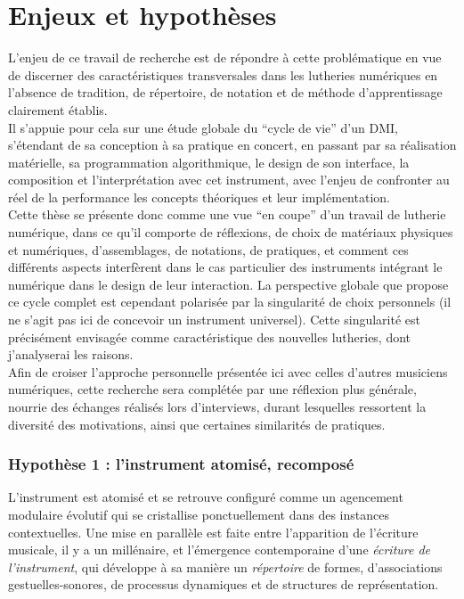 \section{Enjeux et hypothèses}

\noindent L'enjeu de ce travail de recherche est de répondre à cette problématique en vue de discerner des caractéristiques transversales dans les lutheries numériques en l'absence de tradition, de répertoire, de notation et de méthode d'apprentissage clairement établis.\\
\indent Il s'appuie pour cela sur une étude globale du ``cycle de vie'' d'un \gls{DMI}, s'étendant de sa conception à sa pratique en concert, en passant par sa réalisation matérielle, sa programmation algorithmique, le design de son interface, la composition et l'interprétation avec cet instrument, avec l'enjeu de confronter au réel de la performance les concepts théoriques et leur implémentation.\\
\indent Cette thèse se présente donc comme une vue ``en coupe'' d'un travail de lutherie numérique, dans ce qu'il comporte de réflexions, de choix de matériaux physiques et numériques, d'assemblages, de notations, de pratiques, et comment ces différents aspects interfèrent dans le cas particulier des instruments intégrant le numérique dans le design de leur interaction. La perspective globale que propose ce cycle complet est cependant polarisée par la singularité de choix personnels (il ne s'agit pas ici de concevoir un instrument universel). Cette singularité est précisément envisagée comme caractéristique des nouvelles lutheries, dont j'analyserai les raisons.\\
\indent Afin de croiser l'approche personnelle présentée ici avec celles d'autres musiciens numériques, cette recherche sera complétée par une réflexion plus générale, nourrie des échanges réalisés lors d'interviews, durant lesquelles ressortent la diversité des motivations, ainsi que certaines similarités de pratiques.

\subsubsection*{Hypothèse 1 : l'instrument atomisé, recomposé}

\noindent L'instrument est atomisé et se retrouve configuré comme un agencement modulaire évolutif qui se cristallise ponctuellement dans des instances contextuelles. Une mise en parallèle est faite entre l'apparition de l'écriture musicale, il y a un millénaire, et l'émergence contemporaine d'une \textit{écriture de l'instrument}, qui développe à sa manière un \textit{répertoire} de formes, d'associations gestuelles-sonores, de processus dynamiques et de structures de représentation.

